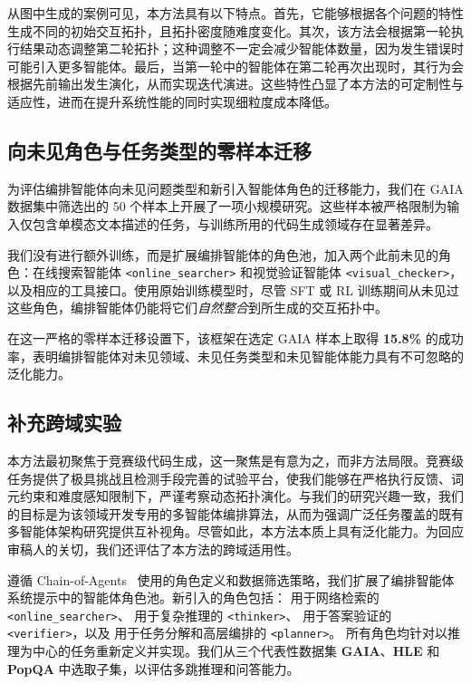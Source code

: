 \documentclass{article}
\theoremstyle{definition}
\begin{document}
从图中生成的案例可见，本方法具有以下特点。首先，它能够根据各个问题的特性生成不同的初始交互拓扑，且拓扑密度随难度变化。其次，该方法会根据第一轮执行结果动态调整第二轮拓扑；这种调整不一定会减少智能体数量，因为发生错误时可能引入更多智能体。最后，当第一轮中的智能体在第二轮再次出现时，其行为会根据先前输出发生演化，从而实现迭代演进。这些特性凸显了本方法的可定制性与适应性，进而在提升系统性能的同时实现细粒度成本降低。
\subsection{向未见角色与任务类型的零样本迁移}
\label{appendix:zero_shot_transfer}

为评估编排智能体向未见问题类型和新引入智能体角色的迁移能力，我们在 GAIA\citep{mialon2023gaia} 数据集中筛选出的 50 个样本上开展了一项小规模研究。这些样本被严格限制为输入仅包含单模态文本描述的任务，与训练所用的代码生成领域存在显著差异。

我们没有进行额外训练，而是扩展编排智能体的角色池，加入两个此前未见的角色：在线搜索智能体 \texttt{<online\_searcher>} 和视觉验证智能体 \texttt{<visual\_checker>}，以及相应的工具接口。使用原始训练模型时，尽管 SFT 或 RL 训练期间从未见过这些角色，编排智能体仍能将它们\emph{自然整合}到所生成的交互拓扑中。

在这一严格的零样本迁移设置下，该框架在选定 GAIA 样本上取得 \textbf{15.8\%} 的成功率，表明编排智能体对未见领域、未见任务类型和未见智能体能力具有不可忽略的泛化能力。
\subsection{补充跨域实验}
\label{appendix:cross_domain}
本方法最初聚焦于竞赛级代码生成，这一聚焦是有意为之，而非方法局限。竞赛级任务提供了极具挑战且检测手段完善的试验平台，使我们能够在严格执行反馈、词元约束和难度感知限制下，严谨考察动态拓扑演化。与我们的研究兴趣一致，我们的目标是为该领域开发专用的多智能体编排算法，从而为强调广泛任务覆盖的既有多智能体架构研究提供互补视角。尽管如此，本方法本质上具有泛化能力。为回应审稿人的关切，我们还评估了本方法的跨域适用性。

遵循 Chain-of-Agents~\cite{li2025chain} 使用的角色定义和数据筛选策略，我们扩展了编排智能体系统提示中的智能体角色池。新引入的角色包括：
用于网络检索的 \texttt{<online\_searcher>}、
用于复杂推理的 \texttt{<thinker>}、
用于答案验证的 \texttt{<verifier>}，以及
用于任务分解和高层编排的 \texttt{<planner>}。
所有角色均针对以推理为中心的任务重新定义并实现。我们从三个代表性数据集 \textbf{GAIA\citep{mialon2023gaia}}、\textbf{HLE\citep{phan2025humanity}} 和 \textbf{PopQA\citep{mallen2023not}} 中选取子集，以评估多跳推理和问答能力。
\end{document}
